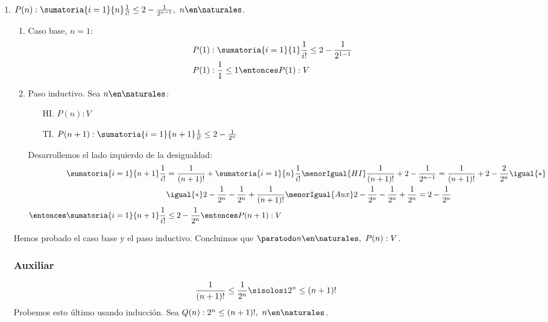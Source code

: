 \begin{enumerate}[label=\magenta{\roman*)}]
  \item $P(n): \sumatoria{i=1}{n} \frac{1}{i!} \leq 2 - \frac{1}{2^{n-1}}, \ n \en \naturales$.
        \begin{enumerate}[label=\arabic*)]
          \item Caso base, $n = 1$:
                \begin{align*}
                  P(1) & : \sumatoria{i=1}{1} \frac{1}{i!} \leq 2 - \frac{1}{2^{1-1}} \\
                  P(1) & : \frac{1}{1} \leq 1 \entonces P(1):V
                \end{align*}
          \item Paso inductivo. Sea $n \en \naturales$:
                \begin{enumerate}
                  \item[HI.] $P(n): V$
                  \item[TI.] $P(n+1):  \sumatoria{i=1}{n+1} \frac{1}{i!} \leq 2 - \frac{1}{2^{n}}$
                \end{enumerate}

                Desarrollemos el lado izquierdo de la desigualdad:
                \begin{align*}
                  \sumatoria{i=1}{n+1} \frac{1}{i!}           & = \frac{1}{(n+1)!} + \sumatoria{i=1}{n} \frac{1}{i!} \menorIgual{HI}
                  \frac{1}{(n+1)!} + 2 - \frac{1}{2^{n-1}} = \frac{1}{(n+1)!} + 2 - \frac{2}{2^{n}} \igual{*}                                        \\
                                                              & \igual{*}  2 - \frac{1}{2^{n}} - \frac{1}{2^{n}} + \frac{1}{(n+1)!} \menorIgual{Aux}
                  2 - \frac{1}{2^{n}} - \frac{1}{2^{n}} + \frac{1}{2^{n}} = 2 - \frac{1}{2^{n}}                                                      \\
                  \entonces \sumatoria{i=1}{n+1} \frac{1}{i!} & \leq 2 - \frac{1}{2^{n}} \entonces P(n+1):V
                \end{align*}
        \end{enumerate}

        Hemos probado el caso base y el paso inductivo. Concluimos que $\paratodo n \en \naturales, \ P(n): V$.

        \subsubsection*{Auxiliar}
        \begin{align*}
          \frac{1}{(n+1)!} \leq \frac{1}{2^n} \sisolosi 2^n \leq (n+1)!
        \end{align*}
        Probemos esto último usando inducción. Sea $Q(n): 2^n \leq (n+1)!, \ n \en \naturales$.


\end{enumerate}
